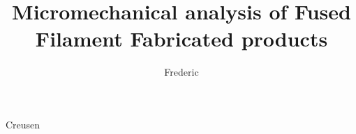 \documentclass{dissertation}
\begin{document}
\title[a Representative Volume Element approach]{Micromechanical analysis of Fused Filament Fabricated products}  
\author{Frederic}{Creusen} %

\frontmatter






\tableofcontents

\mainmatter

\thumbtrue







 
 



\appendix




\thumbfalse

\end{document}
